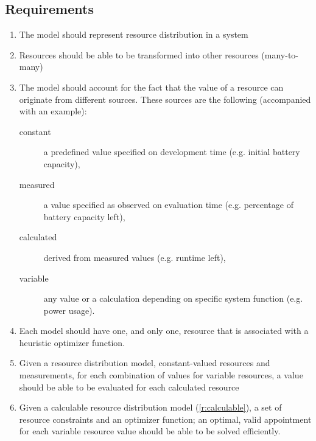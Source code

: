 \subsection{Requirements}
\begin{enumerate}[label=R\rumid .\arabic*]
\item \label{r:main} The model should represent resource distribution in a system
\item \label{r:transform} Resources should be able to be transformed into other resources (many-to-many)
\item \label{r:resource_types} The model should account for the fact that the value of a resource can originate from different sources. These sources are the following (accompanied with an example):
\begin{description}
\item[constant] a predefined value specified on development time (e.g. initial battery capacity),
\item[measured] a value specified as observed on evaluation time (e.g. percentage of battery capacity left),
\item[calculated] derived from measured values (e.g. runtime left),
\item[variable] any value or a calculation depending on specific system function (e.g. power usage).
\end{description}
\item \label{r:optimizer} Each model should have one, and only one, resource that is associated with a heuristic optimizer function.
\item \label{r:calculable}Given a resource distribution model, constant-valued resources and measurements, for each combination of values for variable resources, a value should be able to be evaluated for each calculated resource
\item \label{r:solvable} Given a calculable  resource distribution model (\ref{r:calculable}), a set of resource constraints and an optimizer function; an optimal, valid appointment for each variable resource value should be able to be solved efficiently.
\end{enumerate}

